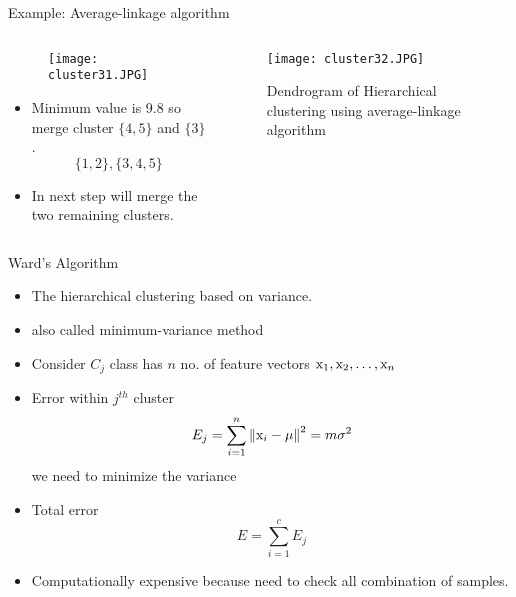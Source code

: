 \begin{frame}{Example: Average-linkage algorithm}
\begin{columns}
\begin{column}{5cm}
\begin{figure}
\texttt{[image: cluster31.JPG]}
\end{figure}
\begin{itemize}
\item Minimum value is 9.8 so merge cluster $\{4,5\}$ and $\{3\}$.
\begin{equation}
\{1,2\},\{3,4,5\}\nonumber
\end{equation}
\item In next step will merge the two remaining clusters.
\end{itemize}
\end{column}
\begin{column}{5.5cm}
\begin{figure}
\texttt{[image: cluster32.JPG]}
\caption{Dendrogram of Hierarchical clustering using average-linkage algorithm}
\end{figure}
\end{column}
\end{columns}
\end{frame}


\begin{frame}{Ward's Algorithm}
\begin{itemize}
\item The hierarchical clustering based on variance.
\item also called minimum-variance method
\item Consider $C_j$ class has $n$ no. of feature vectors ${\rm x}_1,{\rm x}_2,\ldots,{\rm x}_n$
\item Error within $j^{th}$ cluster
\begin{equation}
{E_j} = \sum\limits_{i = 1}^n {{{\left\| {{{\rm x}_i} - \mu } \right\|}^2} = m{\sigma ^2}} \nonumber
\end{equation}
we need to minimize the variance
\item Total error
\begin{equation}
E=\sum\limits_{i = 1}^c E_j \nonumber
\end{equation}
\item Computationally expensive because need to check all combination of samples.
\end{itemize}
\end{frame}

